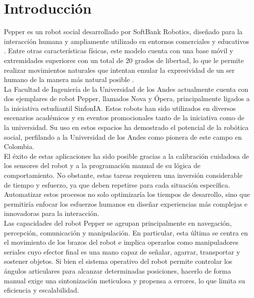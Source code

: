 \section{Introducción}

Pepper es un robot social desarrollado por SoftBank Robotics, diseñado para la interacción humana y ampliamente utilizado en entornos comerciales y educativos \parencite{softbank2023pepper}. Entre otras características físicas, este modelo cuenta con una base móvil y extremidades superiores con un total de 20 grados de libertad, lo que le permite realizar movimientos naturales que intentan emular la expresividad de un ser humano de la manera más natural posible \parencite{softbank2023pepper}. \\

La Facultad de Ingeniería de la Universidad de los Andes actualmente cuenta con dos ejemplares de robot Pepper, llamados Nova y Ópera, principalmente ligados a la iniciativa estudiantil SinfonIA. Estos robots han sido utilizados en diversos escenarios académicos y en eventos promocionales tanto de la iniciativa como de la universidad. Su uso en estos espacios ha demostrado el potencial de la robótica social, perfilando a la Universidad de los Andes como pionera de este campo en Colombia.\\

El éxito de estas aplicaciones ha sido posible gracias a la calibración cuidadosa de los sensores del robot y a la programación manual de su lógica de comportamiento. No obstante, estas tareas requieren una inversión considerable de tiempo y esfuerzo, ya que deben repetirse para cada situación específica. Automatizar estos procesos no solo optimizaría los tiempos de desarrollo, sino que permitiría enfocar los esfuerzos humanos en diseñar experiencias más complejas e innovadoras para la interacción.\\

Las capacidades del robot Pepper se agrupan principalmente en navegación, percepción, comunicación y manipulación. En particular, esta última se centra en el movimiento de los brazos del robot e implica operarlos como manipuladores seriales cuyo efector final es una mano capaz de señalar, agarrar, transportar y sostener objetos. Si bien el sistema operativo del robot permite controlar los ángulos articulares para alcanzar determinadas posiciones, hacerlo de forma manual exige una sintonización meticulosa y propensa a errores, lo que limita su eficiencia y escalabilidad. \\


